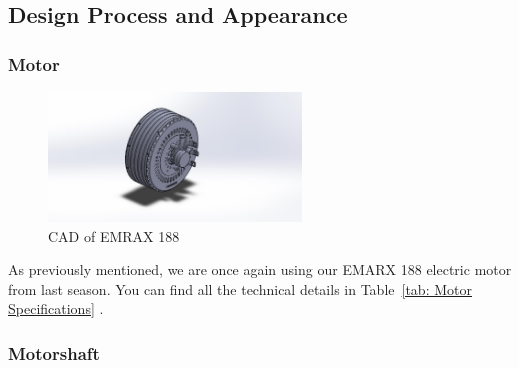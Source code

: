 \subsection{Design Process and Appearance}

\subsubsection{Motor}

\begin{figure}[H]
\centering
\includegraphics[width=0.6\textwidth]{texfiles/mech/eimg/propulsion/picture_motor}
\caption{CAD of EMRAX 188}
\label{}
\end{figure}

As previously mentioned, we are once again using our EMARX 188 electric motor from last season. You can find all the technical details in Table~\ref{tab: Motor Specifications} .



\subsubsection{Motorshaft}

